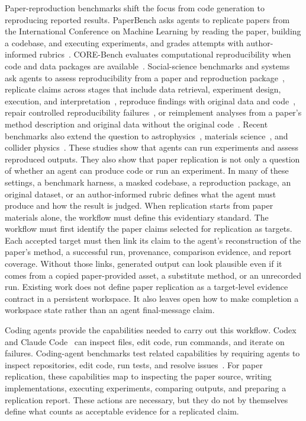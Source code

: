 \documentclass[authoryear,5p,times,nopreprintline]{elsarticle}
\begin{document}
Paper-reproduction benchmarks shift the focus from code generation to reproducing reported results.
PaperBench asks agents to replicate papers from the International Conference on Machine Learning by reading the paper, building a codebase, and executing experiments, and grades attempts with author-informed rubrics~\citep{starace2025paperbench}.
CORE-Bench evaluates computational reproducibility when code and data packages are available~\citep{siegel2024core}.
Social-science benchmarks and systems ask agents to assess reproducibility from a paper and reproduction package~\citep{hu2025repro}, replicate claims across stages that include data retrieval, experiment design, execution, and interpretation~\citep{nguyen2026replicatorbench}, reproduce findings with original data and code~\citep{alizadeh2026ai}, repair controlled reproducibility failures~\citep{shah2026automating}, or reimplement analyses from a paper's method description and original data without the original code~\citep{kohler2026read}.
Recent benchmarks also extend the question to astrophysics~\citep{ye2025replicationbench}, materials science~\citep{huang2026can}, and collider physics~\citep{faroughy2026collider}.
These studies show that agents can run experiments and assess reproduced outputs.
They also show that paper replication is not only a question of whether an agent can produce code or run an experiment.
In many of these settings, a benchmark harness, a masked codebase, a reproduction package, an original dataset, or an author-informed rubric defines what the agent must produce and how the result is judged.
When replication starts from paper materials alone, the workflow must define this evidentiary standard.
The workflow must first identify the paper claims selected for replication as targets.
Each accepted target must then link its claim to the agent's reconstruction of the paper's method, a successful run, provenance, comparison evidence, and report coverage.
Without those links, generated output can look plausible even if it comes from a copied paper-provided asset, a substitute method, or an unrecorded run.
Existing work does not define paper replication as a target-level evidence contract in a persistent workspace.
It also leaves open how to make completion a workspace state rather than an agent final-message claim.

Coding agents provide the capabilities needed to carry out this workflow.
Codex~\citep{openai2026codexweb} and Claude Code~\citep{anthropic2026claudecode} can inspect files, edit code, run commands, and iterate on failures.
Coding-agent benchmarks test related capabilities by requiring agents to inspect repositories, edit code, run tests, and resolve issues~\citep{jimenez2024swe,yang2024swe}.
For paper replication, these capabilities map to inspecting the paper source, writing implementations, executing experiments, comparing outputs, and preparing a replication report.
These actions are necessary, but they do not by themselves define what counts as acceptable evidence for a replicated claim.
\end{document}

